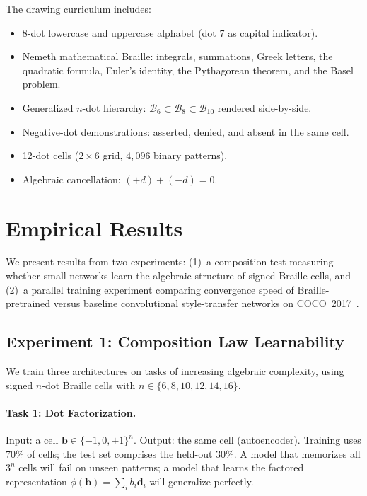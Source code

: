 \documentclass[11pt,a4paper]{article}
\newcommand{\B}{\mathcal{B}}
\newcommand{\bvec}{\bm{b}}
\newcommand{\dvec}{\bm{d}}
\begin{document}
The drawing curriculum includes:
\begin{itemize}
  \item 8-dot lowercase and uppercase alphabet
    (dot 7 as capital indicator).
  \item Nemeth mathematical Braille: integrals, summations,
    Greek letters, the quadratic formula, Euler's identity,
    the Pythagorean theorem, and the Basel problem.
  \item Generalized $n$-dot hierarchy:
    $\B_6 \subset \B_8 \subset \B_{10}$ rendered side-by-side.
  \item Negative-dot demonstrations:
    asserted, denied, and absent in the same cell.
  \item 12-dot cells ($2 \times 6$ grid, $4{,}096$ binary patterns).
  \item Algebraic cancellation: $(+d) + (-d) = 0$.
\end{itemize}

\section{Empirical Results}
\label{sec:results}

We present results from two experiments:
(1)~a composition test measuring whether small networks learn the
algebraic structure of signed Braille cells, and
(2)~a parallel training experiment comparing convergence speed of
Braille-pretrained versus baseline convolutional style-transfer
networks on COCO~2017~\cite{lin2014coco}.

\subsection{Experiment 1: Composition Law Learnability}

We train three architectures on tasks of increasing algebraic complexity,
using signed $n$-dot Braille cells with $n \in \{6, 8, 10, 12, 14, 16\}$.

\paragraph{Task 1: Dot Factorization.}
Input: a cell $\bvec \in \{-1,0,+1\}^n$.
Output: the same cell (autoencoder).
Training uses 70\% of cells; the test set comprises the held-out 30\%.
A model that memorizes all $3^n$ cells will fail on unseen patterns;
a model that learns the factored representation
$\phi(\bvec) = \sum_i b_i \dvec_i$ will generalize perfectly.
\end{document}
